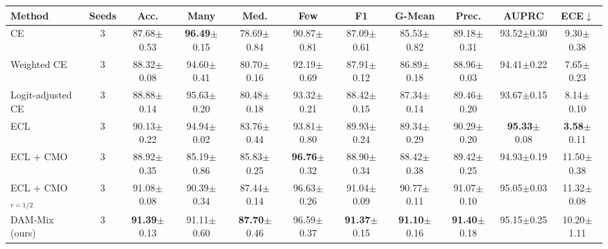 \begin{tabular}{l c ccccccccc}
\toprule
Method & Seeds & Acc. & Many & Med. & Few & F1 & G-Mean & Prec. & AUPRC & ECE$\downarrow$ \\
\midrule
CE & 3 & 87.68{\scriptsize$\pm$0.53} & \textbf{96.49}{\scriptsize$\pm$0.15} & 78.69{\scriptsize$\pm$0.84} & 90.87{\scriptsize$\pm$0.81} & 87.09{\scriptsize$\pm$0.61} & 85.53{\scriptsize$\pm$0.82} & 89.18{\scriptsize$\pm$0.31} & 93.52{\scriptsize$\pm$0.30} & 9.30{\scriptsize$\pm$0.38} \\
Weighted CE & 3 & 88.32{\scriptsize$\pm$0.08} & 94.60{\scriptsize$\pm$0.41} & 80.70{\scriptsize$\pm$0.16} & 92.19{\scriptsize$\pm$0.69} & 87.91{\scriptsize$\pm$0.12} & 86.89{\scriptsize$\pm$0.18} & 88.96{\scriptsize$\pm$0.03} & 94.41{\scriptsize$\pm$0.22} & 7.65{\scriptsize$\pm$0.23} \\
Logit-adjusted CE & 3 & 88.88{\scriptsize$\pm$0.14} & 95.63{\scriptsize$\pm$0.20} & 80.48{\scriptsize$\pm$0.18} & 93.32{\scriptsize$\pm$0.21} & 88.42{\scriptsize$\pm$0.15} & 87.34{\scriptsize$\pm$0.14} & 89.46{\scriptsize$\pm$0.20} & 93.67{\scriptsize$\pm$0.15} & 8.14{\scriptsize$\pm$0.10} \\
ECL & 3 & 90.13{\scriptsize$\pm$0.22} & 94.94{\scriptsize$\pm$0.02} & 83.76{\scriptsize$\pm$0.44} & 93.81{\scriptsize$\pm$0.80} & 89.93{\scriptsize$\pm$0.24} & 89.34{\scriptsize$\pm$0.29} & 90.29{\scriptsize$\pm$0.20} & \textbf{95.33}{\scriptsize$\pm$0.08} & \textbf{3.58}{\scriptsize$\pm$0.11} \\
ECL + CMO & 3 & 88.92{\scriptsize$\pm$0.35} & 85.19{\scriptsize$\pm$0.86} & 85.83{\scriptsize$\pm$0.25} & \textbf{96.76}{\scriptsize$\pm$0.32} & 88.90{\scriptsize$\pm$0.34} & 88.42{\scriptsize$\pm$0.38} & 89.42{\scriptsize$\pm$0.25} & 94.93{\scriptsize$\pm$0.19} & 11.50{\scriptsize$\pm$0.38} \\
ECL + CMO$_{r=1/2}$ & 3 & 91.08{\scriptsize$\pm$0.08} & 90.39{\scriptsize$\pm$0.34} & 87.44{\scriptsize$\pm$0.14} & 96.63{\scriptsize$\pm$0.26} & 91.04{\scriptsize$\pm$0.09} & 90.77{\scriptsize$\pm$0.11} & 91.07{\scriptsize$\pm$0.10} & 95.05{\scriptsize$\pm$0.03} & 11.32{\scriptsize$\pm$0.08} \\
\midrule
DAM-Mix (ours) & 3 & \textbf{91.39}{\scriptsize$\pm$0.13} & 91.11{\scriptsize$\pm$0.60} & \textbf{87.70}{\scriptsize$\pm$0.46} & 96.59{\scriptsize$\pm$0.37} & \textbf{91.37}{\scriptsize$\pm$0.15} & \textbf{91.10}{\scriptsize$\pm$0.16} & \textbf{91.40}{\scriptsize$\pm$0.18} & 95.15{\scriptsize$\pm$0.25} & 10.20{\scriptsize$\pm$1.11} \\
\bottomrule
\end{tabular}
